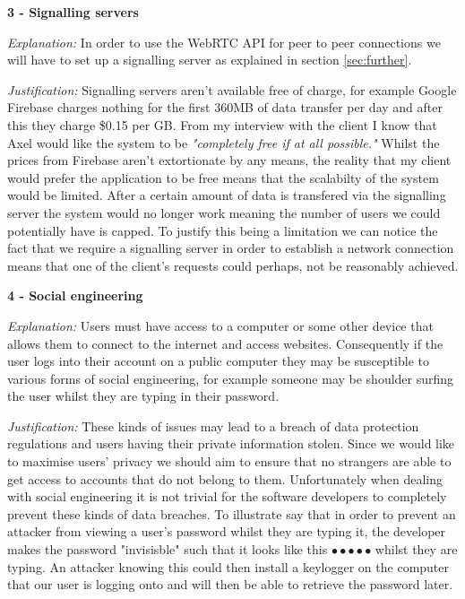 \textsf{\bfseries 3 - Signalling servers} \\ \vspace{0.1cm}

\textit{Explanation:}
In order to use the WebRTC API for peer to peer connections we
will have to set up a signalling server as explained in 
section \ref{sec:further}. \vspace{0.1cm}

\textit{Justification:}
Signalling servers aren't
available free of charge, for example Google Firebase charges
nothing for the 
first 360MB of data transfer per day and after this they charge
\$0.15 per GB. From my interview with the client I know that 
Axel would like the system to be \textit{"completely free if
at all possible."} Whilst the prices from Firebase aren't 
extortionate by any means, the reality that my client would
prefer the application to be free means that the scalabilty of
the system would be limited. After a certain amount of data is 
transfered via the signalling server the system would no longer
work meaning the number of users we could potentially have is 
capped. To justify this being a limitation we can notice 
the fact that we require a signalling server in order to
establish a network connection means that one of the client's
requests could perhaps, not be reasonably achieved. \\
\vspace{0.2cm}

\textsf{\bfseries 4 - Social engineering} \\ \vspace{0.1cm}

\textit{Explanation:}
Users must have access to a computer or some other device that
allows them to connect to the internet and access websites. 
Consequently if the user logs into their account on a public 
computer they may be susceptible to various forms of social 
engineering, for example someone may be shoulder surfing the 
user whilst they are typing in their password. \vspace{0.1cm}

\textit{Justification:}
These kinds of issues may lead to a breach of data protection
regulations and users having their private information stolen.
Since we would like to maximise users' privacy we should aim 
to ensure that no strangers are able to get access to accounts
that do not belong to them. Unfortunately when dealing with 
social engineering it is not trivial for the software 
developers to completely prevent these kinds of data breaches.
To illustrate say that in order to prevent an attacker from 
viewing a user's password whilst they are typing it, the 
developer makes the password "invisisble" such that it looks
like this  $\bullet \bullet \bullet \bullet \bullet$ whilst
they are typing. An attacker knowing this could then install 
a keylogger on the computer that our user is logging onto and
will then be able to retrieve the password later.

